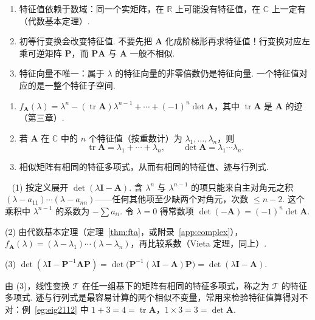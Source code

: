 \documentclass[lang=cn,10.5pt,scheme=chinese,toc=twocol,section,chinesefont=nofont,
twoside,citestyle=gb7714-2015,bibstyle=gb7714-2015]{elegantbook}
\DeclareRobustCommand{\textbf}[1]{{\lnsemiboldlatin\lnsemiboldcjk #1}}
\newcommand{\vv}[1]{\boldsymbol{#1}}
\numberwithin{equation}{section}   %
\providecommand{\tr}{\operatorname{tr}}     %
\newcommand*{\lnlabel}[1]{{\sffamily\bfseries\color{black}#1}}
\renewenvironment{proof}{%
	\par\noindent\lnlabel{\proofname}\;\ \color{black!90}\cfs}{\par}
\begin{document}
\begin{pitfallbox}
  \begin{enumerate}
    \item 特征值依赖于数域：同一个实矩阵，在 $\mathbb{R}$ 上可能没有特征值，在 $\mathbb{C}$ 上一定有（代数基本定理）.
    \item \textbf{初等行变换会改变特征值}. 不要先把 $\vv A$ 化成阶梯形再求特征值！行变换对应左乘可逆矩阵 $\vv P$，而 $\vv{PA}$ 与 $\vv A$ 一般不相似.
    \item 特征向量不唯一：属于 $\lambda$ 的特征向量的非零倍数仍是特征向量. 一个特征值对应的是一整个特征子空间.
  \end{enumerate}
\end{pitfallbox}

\begin{theorem}
  \label{thm:charpoly}
  \begin{enumerate}
    \item $f_{\vv A}(\lambda)=\lambda^n-(\tr\vv A)\lambda^{n-1}+\cdots+(-1)^n\det\vv A$，其中 $\tr\vv A$ 是 $\vv A$ 的迹（第三章）.
    \item 若 $\vv A$ 在 $\mathbb{C}$ 中的 $n$ 个特征值（按重数计）为 $\lambda_1,\ldots,\lambda_n$，则
          \[\operatorname{tr}\vv A=\lambda_1+\cdots+\lambda_n,\qquad\det\vv A=\lambda_1\cdots\lambda_n.\]
    \item 相似矩阵有相同的特征多项式，从而有相同的特征值、迹与行列式.
  \end{enumerate}
\end{theorem}
\begin{proof}
  (1) 按定义展开 $\det(\lambda\vv I-\vv A)$. 含 $\lambda^n$ 与 $\lambda^{n-1}$ 的项只能来自主对角元之积 $(\lambda-a_{11})\cdots(\lambda-a_{nn})$——任何其他项至少缺两个对角元，次数 $\le n-2$. 这个乘积中 $\lambda^{n-1}$ 的系数为 $-\sum a_{ii}$. 令 $\lambda=0$ 得常数项 $\det(-\vv A)=(-1)^n\det\vv A$.

  (2) 由代数基本定理（定理~\ref{thm:fta}，或附录~\ref{app:complex}），$f_{\vv A}(\lambda)=(\lambda-\lambda_1)\cdots(\lambda-\lambda_n)$，再比较系数（Vieta 定理，同上）.%

  (3) $\det(\lambda\vv I-\vv P^{-1}\vv{AP})=\det\big(\vv P^{-1}(\lambda\vv I-\vv A)\vv P\big)=\det(\lambda\vv I-\vv A)$.
\end{proof}

由 (3)，线性变换 $\mathscr T$ 在任一组基下的矩阵有相同的特征多项式，称之为 $\mathscr T$ 的特征多项式. 迹与行列式是最容易计算的两个\textbf{相似不变量}，常用来检验特征值算得对不对：例~\ref{eg:eig2112} 中 $1+3=4=\operatorname{tr}\vv A$，$1\times3=3=\det\vv A$.
\end{document}

